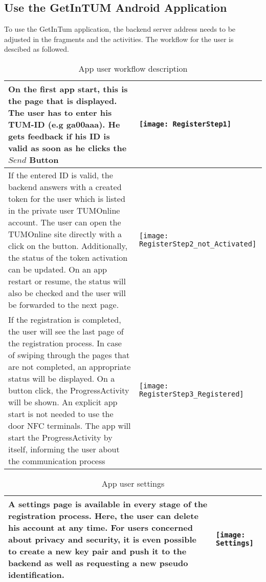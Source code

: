 \subsection{Use the GetInTUM Android Application}

To use the GetInTum application, the backend server address needs to be adjusted in the fragments and the activities.
The workflow for the user is descibed as followed.  

\begin{table}[ht]
\caption{App user workflow description}
\centering
\begin{tabular}{*{2}{m{}}}
\hline
On the first app start, this is the page
that is displayed. The user has to enter his TUM-ID (e.g ga00aaa).
He gets feedback if his ID is valid as soon as he clicks the $Send$ Button
&\texttt{[image: RegisterStep1]}\\
\hline
If the entered ID is valid, the backend answers with a created token for
the user which is listed in the private user TUMOnline account.
The user can open the TUMOnline site directly with a click on the button.
Additionally, the status of the token activation can be updated. On an app restart or resume, the status will also be checked and the user will be forwarded to the next page.
&\texttt{[image: RegisterStep2\_not\_Activated]}\\
\hline
If the registration is completed, the user will see the last page of the registration process.
In case of swiping through the pages that are not completed, an appropriate status will be displayed. On a button click, the ProgressActivity will be shown.
An explicit app start is not needed to use the door NFC terminals. The app will start the
ProgressActivity by itself, informing the user about the communication process
&\texttt{[image: RegisterStep3\_Registered]}\\
\end{tabular}
\label{tab:gt}
\end{table}

\begin{table}[ht!]
\caption{App user settings}
\begin{tabular}{*{2}{m{}}}
\hline
A settings page is available in every stage of the registration process. 
Here, the user can delete his account at any time. For users concerned about privacy and security, it is even possible to create a new key pair and push it to the backend
as well as requesting a new pseudo identification.
&\texttt{[image: Settings]}\\
\hline
\end{tabular}
\label{tab:gt}
\end{table}


